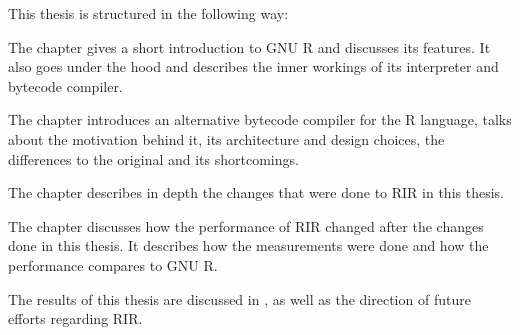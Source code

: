 
This thesis is structured in the following way:

The chapter \emph{} gives a short introduction to GNU R and discusses its features. It also goes under the hood and describes the inner workings of its interpreter and bytecode compiler.

The chapter \emph{} introduces an alternative bytecode compiler for the R language, talks about the motivation behind it, its architecture and design choices, the differences to the original and its shortcomings.

The chapter \emph{} describes in depth the changes that were done to RIR in this thesis.\todo[?]

The chapter \emph{} discusses how the performance of RIR changed after the changes done in this thesis. It describes how the measurements were done and how the performance compares to GNU R.\todo[?]

The results of this thesis are discussed in \emph{}, as well as the direction of future efforts regarding RIR.
